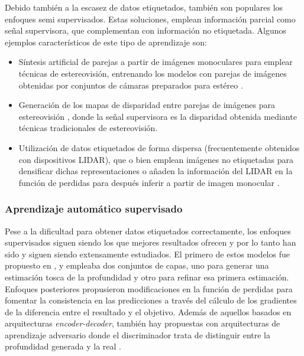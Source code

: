 Debido también a la escasez de datos etiquetados, también son populares los enfoques semi supervisados. Estas soluciones, emplean información parcial como señal supervisora, que complementan con información no etiquetada. Algunos ejemplos característicos de este tipo de aprendizaje son: 
\begin{itemize}
    \item Síntesis artificial de parejas a partir de imágenes monoculares para emplear técnicas de estereovisión, entrenando los modelos con parejas de imágenes obtenidas por conjuntos de cámaras preparados para estéreo \cite{monocularstereosynthesis, single-view-stereo-matching}.
    \item Generación de los mapas de disparidad entre parejas de imágenes para estereovisión \cite{importancestereo, deep3d}, donde la señal supervisora es la disparidad obtenida mediante técnicas tradicionales de estereovisión.
    \item Utilización de datos etiquetados de forma dispersa (frecuentemente obtenidos con dispositivos LIDAR), que o bien emplean imágenes no etiquetadas para densificar dichas representaciones \cite{lidarcompletion, sparse-to-dense, hu2020PENet} o añaden la información del LIDAR en la función de perdidas para después inferir a partir de imagen monocular \cite{lidarlossfunction}.
\end{itemize}

\subsubsection{Aprendizaje automático supervisado} \label{aprendizaje-supervisado}
Pese a la dificultad para obtener datos etiquetados correctamente, los enfoques supervisados siguen siendo los que mejores resultados ofrecen y por lo tanto han sido y siguen siendo extensamente estudiados. El primero de estos modelos fue propuesto en \cite{eigen-multi-scale}, y empleaba dos conjuntos de capas, uno para generar una estimación tosca de la profundidad y otro para refinar esa primera estimación. Enfoques posteriores propusieron modificaciones en la función de perdidas para fomentar la consistencia en las predicciones \cite{surfacenormals} a través del cálculo de los gradientes de la diferencia entre el resultado y el objetivo. Además de aquellos basados en arquitecturas \textit{encoder-decoder}, también hay propuestas con arquitecturas de aprendizaje adversario \cite{gan} donde el discriminador trata de distinguir entre la profundidad generada y la real \cite{gan-depth}.

